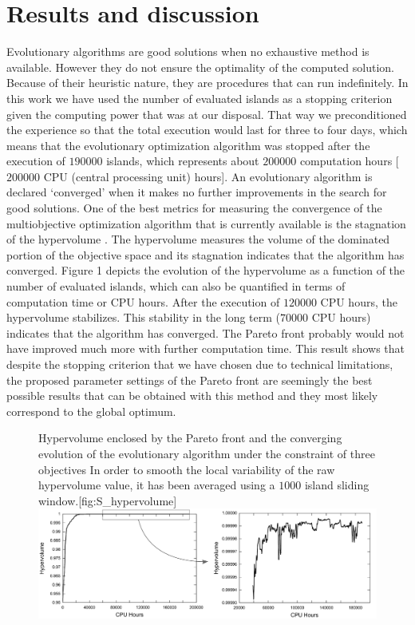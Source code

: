 \section{Results and discussion}
\label{sec:results}

Evolutionary algorithms are good solutions when no exhaustive method is available. However they do not ensure the optimality of the computed solution. Because of their heuristic nature, they are procedures that can run indefinitely. In this work we have used the number of evaluated islands as a stopping criterion given the computing power that was at our disposal. That way we preconditioned the experience so that the total execution would last for three to four days, which means that the evolutionary optimization algorithm was stopped after the execution of $\num{190000}$ islands, which represents about $\num{200000}$ computation hours [$\num{200000}$ CPU (central processing unit) hours]. An evolutionary algorithm is declared ‘converged’ when it makes no further improvements in the search for good solutions. One of the best metrics for measuring the convergence of the multiobjective optimization algorithm that is currently available is the stagnation of the hypervolume \autocites{Fonseca2006,Naujoks2005,Zitzler1998}. The hypervolume measures the volume of the dominated portion of the objective space and its stagnation indicates that the algorithm has converged. Figure 1 depicts the evolution of the hypervolume as a function of the number of evaluated islands, which can also be quantified in terms of computation time or CPU hours. After the execution of $\num{120000}$ CPU hours, the hypervolume stabilizes. This stability in the long term ($\num{70000}$ CPU hours) indicates that the algorithm has converged. The Pareto front probably would not have improved much more with further computation time. This result shows that despite the stopping criterion that we have chosen due to technical limitations, the proposed parameter settings of the Pareto front are seemingly the best possible results that can be obtained with this method and they most likely correspond to the global optimum.

\begin{figure}[!htbp]
\begin{sidecaption}[fortoc]{Hypervolume enclosed by the Pareto front and the converging evolution of the evolutionary algorithm under the constraint of three objectives In order to smooth the local variability of the raw
hypervolume value, it has been averaged using a $\num{1000}$ island sliding window.}[fig:S_hypervolume]
  \centering
 \includegraphics[width=1.0\linewidth]{half_billion_simulation_fig1_hypervolume.png}
  \end{sidecaption}
\end{figure}

